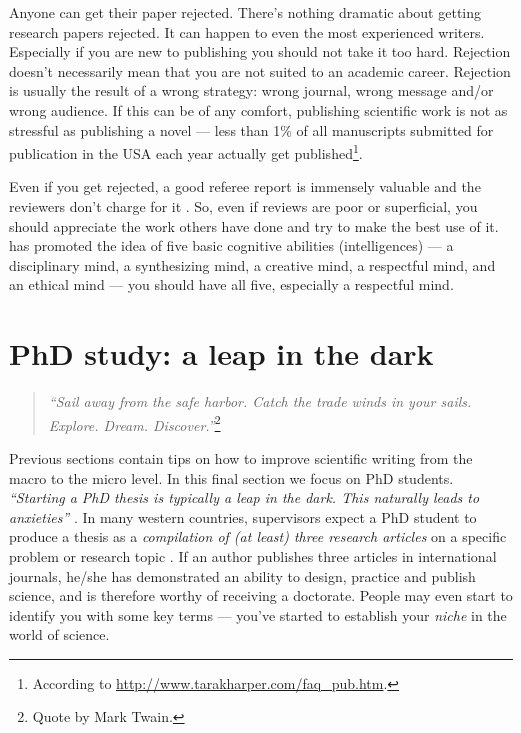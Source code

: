 \documentclass[graybox,envcountchap,sectrefs,UStrade]{svmono}
\begin{document}
Anyone can get their paper rejected. There's nothing dramatic about getting research papers rejected. It can happen to even the most experienced writers. Especially if you are new to publishing you should not take it too hard. Rejection doesn't necessarily mean that you are not suited to an academic career. Rejection is usually the result of a wrong strategy: wrong journal, wrong message and/or wrong audience. If this can be of any comfort, publishing scientific work is not as stressful as publishing a novel --- less than 1\% of all manuscripts submitted for publication in the USA each year actually get published\footnote{According to \url{http://www.tarakharper.com/faq_pub.htm}.}. \par

Even if you get rejected, a good referee report is immensely valuable and the reviewers don't charge for it \citep{Smith1990TR,turabian2007manual}. So, even if reviews are poor or superficial, you should appreciate the work others have done and try to make the best use of it. \citet{gardner2006five} has promoted the idea of five basic cognitive abilities (intelligences) --- a disciplinary mind, a synthesizing mind, a creative mind, a respectful mind, and an ethical mind --- you should have all five, especially a respectful mind. \par


\section{PhD study: a leap in the dark}

\begin{quote}
    \emph{``Sail away from the safe harbor. Catch the trade winds in your sails. Explore. Dream. Discover.''}\footnote{Quote by Mark Twain.}
\end{quote}

Previous sections contain tips on how to improve scientific writing from the macro to the micro level. In this final section we focus on PhD students. \emph{``Starting a PhD thesis is typically a leap in the dark. This naturally leads to anxieties''} \citep{Creedy2008research}. In many western countries, supervisors expect a PhD student to produce a thesis as a \emph{compilation of (at least) three research articles} on a specific problem or research topic \citet{Hartley2000PPAGQN,Hartley2009HER}. If an author publishes three articles in international journals, he/she has demonstrated an ability to design, practice and publish science, and is therefore worthy of receiving a doctorate. People may even start to identify you with some key terms --- you've started to establish your \emph{niche} in the world of science.\par
\end{document}
